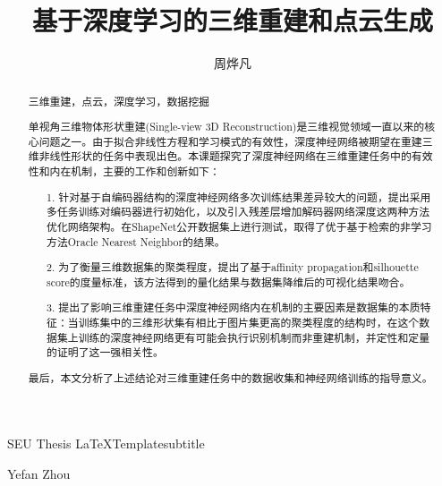 \documentclass[bachelor, nocolorlinks, printoneside]{seuthesis} %
\begin{document}

\title{基于深度学习的三维重建和点云生成}{}{SEU Thesis \LaTeX Template}{subtitle}
\author{周烨凡}{Yefan Zhou}




\maketitle

\begin{abstract}{三维重建，点云，深度学习，数据挖掘}

    单视角三维物体形状重建(Single-view 3D Reconstruction)是三维视觉领域一直以来的核心问题之一。由于拟合非线性方程和学习模式的有效性，深度神经网络被期望在重建三维非线性形状的任务中表现出色。本课题探究了深度神经网络在三维重建任务中的有效性和内在机制，主要的工作和创新如下：
        
        \begin{enumerate}
            \item[1.] 针对基于自编码器结构的深度神经网络多次训练结果差异较大的问题，提出采用多任务训练对编码器进行初始化，以及引入残差层增加解码器网络深度这两种方法优化网络架构。在ShapeNet公开数据集上进行测试，取得了优于基于检索的非学习方法Oracle Nearest Neighbor的结果。
            \item[2.] 为了衡量三维数据集的聚类程度，提出了基于affinity propagation和silhouette score的度量标准，该方法得到的量化结果与数据集降维后的可视化结果吻合。
            \item[3.] 提出了影响三维重建任务中深度神经网络内在机制的主要因素是数据集的本质特征：当训练集中的三维形状集有相比于图片集更高的聚类程度的结构时，在这个数据集上训练的深度神经网络更有可能会执行识别机制而非重建机制，并定性和定量的证明了这一强相关性。
        \end{enumerate}
    最后，本文分析了上述结论对三维重建任务中的数据收集和神经网络训练的指导意义。
    \end{abstract}
\end{document}
